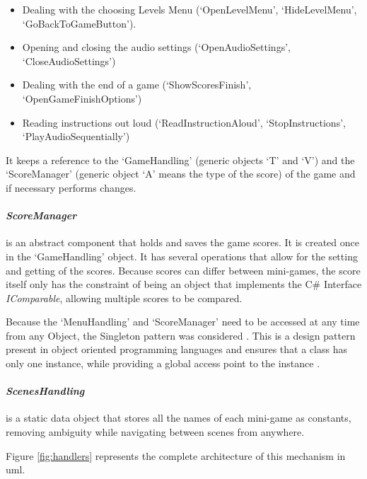 \begin{itemize}
    \item Dealing with the choosing Levels Menu (`OpenLevelMenu', `HideLevelMenu', `GoBackToGameButton').
    \item Opening and closing the audio settings (`OpenAudioSettings', `CloseAudioSettings')
    \item Dealing with the end of a game (`ShowScoresFinish', `OpenGameFinishOptions')
    \item Reading instructions out loud (`ReadInstructionAloud', `StopInstructions', `PlayAudioSequentially')
\end{itemize}

It keeps a reference to the `GameHandling' (generic objects `T' and `V') and the `ScoreManager' (generic object `A' means the type of the score) of the game and if necessary performs changes.\\

\paragraph{\textit{ScoreManager}} is an abstract component that holds and saves the game scores. It is created once in the `GameHandling' object. It has several operations that allow for the setting and getting of the scores. Because scores can differ between mini-games, the score itself only has the constraint of being an object that implements the C\# Interface \textit{IComparable}, allowing multiple scores to be compared.

Because the `MenuHandling' and `ScoreManager' need to be accessed at any time from any Object, the Singleton pattern was considered \cite{singleton}. This is a design pattern present in object oriented programming languages and ensures that a class has only one instance, while providing a global access point to the instance \cite{gamma1994design}.

\paragraph{\textit{ScenesHandling}} is a static data object that stores all the names of each mini-game as constants, removing ambiguity while navigating between scenes from anywhere.

Figure \ref{fig:handlers} represents the complete architecture of this mechanism in \gls{uml}.

